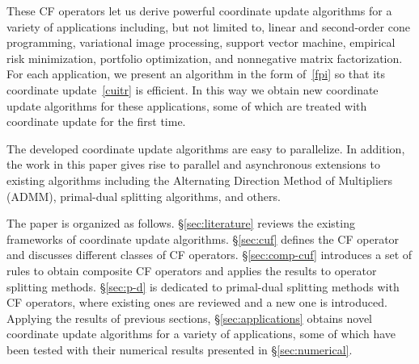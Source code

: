 These CF operators let us derive powerful coordinate update algorithms for a variety of applications including, but not limited to, linear and second-order cone programming, variational image processing, support vector machine, empirical risk minimization, portfolio optimization, and nonnegative matrix factorization. For each application, we present an algorithm in the form of~\eqref{fpi} so that its coordinate update~\eqref{cuitr} is efficient. %
{In this way we obtain new coordinate update algorithms for these applications, some of which  are treated with coordinate update for the first time. %
}



The developed coordinate update algorithms are easy to parallelize. In addition,  the work in this paper  gives rise to parallel and asynchronous extensions to  existing algorithms including the Alternating Direction Method of Multipliers (ADMM), primal-dual splitting algorithms, and others.

The paper is organized as follows. \S\ref{sec:literature} reviews the existing frameworks of coordinate update algorithms. \S\ref{sec:cuf} defines the CF operator and discusses different classes of CF operators. \S\ref{sec:comp-cuf}  introduces a set of rules to obtain composite CF operators and applies the results to operator splitting methods. \S\ref{sec:p-d} is dedicated to  primal-dual splitting methods with CF operators, where existing ones are reviewed and a new one is introduced. Applying the results of previous sections, \S\ref{sec:applications} obtains novel coordinate update algorithms for a variety of applications, some of which have been tested with their numerical results presented in \S\ref{sec:numerical}.


